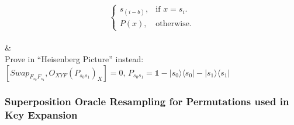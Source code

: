 \documentclass[12pt]{article}
\begin{document}
\begin{table}[htp]
{\begin{tblr}
{\begin{equation*}
\begin{cases}
                            {s}_{(i - b)}, & \text{if $x = {s}_{i}$}.\\
                            P(x), & \text{otherwise}.
                        \end{cases}
                    \end{equation*}
                } \\
                & \\
                Prove in ``Heisenberg Picture'' instead: \\
                \color{red}$\left[ {Swap}_{{F}_{{s}_{0}}{F}_{{s}_{1}}},{O}_{XYF} {\left( {P}_{{s}_{0}{s}_{1}} \right)}_{X} \right] = 0$, ${P}_{{s}_{0}{s}_{1}} = \mathds{1} - |{s}_{0}\rangle\langle{s}_{0}| - |{s}_{1}\rangle\langle{s}_{1}|$\color{black}\\
            \end{tblr}
        }
        \label{tab:global-overview-main-differences-between-random-permutation-oracle-and-quantum-superposition-oracle}
        \caption{\centering Global Overview of the main differences between\break the Random Permutation Oracle and Quantum Superposition Oracle.}
    \end{table}

    \clearpage
    
    \subsubsection{Superposition Oracle Resampling for Permutations used in Key Expansion}
    \label{subsubsec:superposition-oracle-resampling-permutations-key-expansion}
\end{document}
